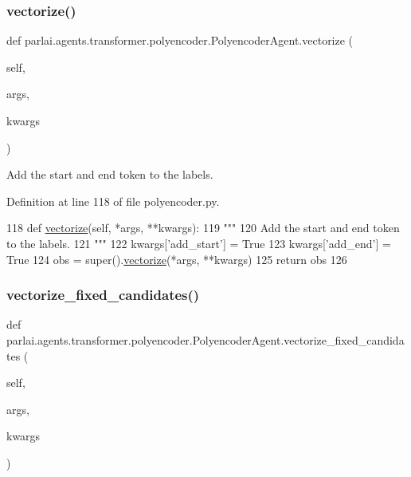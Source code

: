 \subsubsection{\texorpdfstring{vectorize()}{vectorize()}}
{\footnotesize\ttfamily def parlai.\+agents.\+transformer.\+polyencoder.\+Polyencoder\+Agent.\+vectorize (\begin{DoxyParamCaption}\item[{}]{self,  }\item[{}]{args,  }\item[{}]{kwargs }\end{DoxyParamCaption})}

\begin{DoxyVerb}Add the start and end token to the labels.
\end{DoxyVerb}
 

Definition at line 118 of file polyencoder.\+py.


\begin{DoxyCode}
118     \textcolor{keyword}{def }\hyperlink{namespaceparlai_1_1agents_1_1drqa_1_1utils_a5c76cc39e3014c7bcf9199d566dbdc0f}{vectorize}(self, *args, **kwargs):
119         \textcolor{stringliteral}{"""}
120 \textcolor{stringliteral}{        Add the start and end token to the labels.}
121 \textcolor{stringliteral}{        """}
122         kwargs[\textcolor{stringliteral}{'add\_start'}] = \textcolor{keyword}{True}
123         kwargs[\textcolor{stringliteral}{'add\_end'}] = \textcolor{keyword}{True}
124         obs = super().\hyperlink{namespaceparlai_1_1agents_1_1drqa_1_1utils_a5c76cc39e3014c7bcf9199d566dbdc0f}{vectorize}(*args, **kwargs)
125         \textcolor{keywordflow}{return} obs
126 
\end{DoxyCode}
\mbox{\label{classparlai_1_1agents_1_1transformer_1_1polyencoder_1_1PolyencoderAgent_ad002f52bc5bfbe8269983bbfc0988f98}} 
\subsubsection{\texorpdfstring{vectorize\+\_\+fixed\+\_\+candidates()}{vectorize\_fixed\_candidates()}}
{\footnotesize\ttfamily def parlai.\+agents.\+transformer.\+polyencoder.\+Polyencoder\+Agent.\+vectorize\+\_\+fixed\+\_\+candidates (\begin{DoxyParamCaption}\item[{}]{self,  }\item[{}]{args,  }\item[{}]{kwargs }\end{DoxyParamCaption})}

